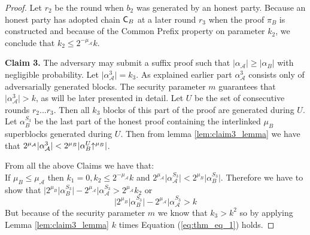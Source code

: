 \begin{proof}
Let $r_2$ be the round when $b_2$ was generated by an honest party. Because an honest party has adopted chain $\mathsf{C}_B$ at a later round $r_3$ when the proof $\pi_B$ is constructed and because of the Common Prefix property on parameter $k_2$, we conclude that $k_2 \leq 2^{-\mu_\mathcal{A}}k$.

\textbf{Claim 3.} The adversary may submit a suffix proof such that $\lvert \alpha_\mathcal{A}\rvert \geq \lvert \alpha_B \rvert$ with negligible probability. Let $ \lvert \alpha_\mathcal{A}^3 \rvert = k_3$. As explained earlier part $\alpha^3_\mathcal{A}$ consists only of adversarially generated blocks. The security parameter $m$ guarantees that $\lvert \alpha^3_\mathcal{A} \rvert > k$, as will be later presented in detail. Let $U$ be the set of consecutive rounds $r_2...r_3$. Then all $k_3$ blocks of this part of the proof are generated during $U$. Let $\alpha^{S_3}_B$ be the last part of the honest proof containing the interlinked $\mu_B$ superblocks generated during $U$. Then from lemma \ref{lem:claim3_lemma} we have that $ 2^{\mu_\mathcal{A}}\lvert \alpha^3_\mathcal{A} \rvert < 2^{\mu_B} \lvert \alpha^U_{B}\negthickspace\uparrow^{\mu_B} \rvert $.

From all the above Claims we have that:\\
If $\mu_B \leq \mu_\mathcal{A}$ then $k_1 = 0, k_2 \leq 2^{-\mu_\mathcal{A}}k$ and $2^{\mu_\mathcal{A}} \lvert \alpha_\mathcal{A}^{S_3} \rvert < 2^{\mu_B} \lvert \alpha{_B^{S_3}} \rvert$. Therefore we have to show that  $ \rvert 2^{\mu_B} \lvert \alpha{_B^{S_3}} \rvert - 2^{\mu_\mathcal{A}} \lvert \alpha_\mathcal{A}^{S_3} > 2^{\mu_\mathcal{A}}k_2 $ or \begin{equation}\label{eq:thm_eq_1}
    \rvert 2^{\mu_B} \lvert \alpha{_B^{S_3}} \rvert - 2^{\mu_\mathcal{A}} \lvert \alpha_\mathcal{A}^{S_3} > k
\end{equation} But because of the security parameter $m$ we know that $k_3 > k^2$ so by applying Lemma \ref{lem:claim3_lemma} $k$ times Equation (\ref{eq:thm_eq_1}) holds.

%
\end{proof}